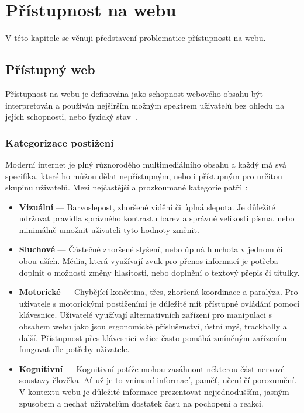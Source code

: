 \chapter{Přístupnost na webu}

V této kapitole se věnuji představení problematice přístupnosti na webu.

\section{Přístupný web}

Přístupnost na webu je definována jako schopnost webového obsahu být interpretován a používán nejširším možným spektrem uživatelů bez ohledu na jejich schopnosti, nebo fyzický stav~\cite{w3-accessibility}.

\subsection{Kategorizace postižení}

Moderní internet je plný různorodého multimediálního obsahu a každý má svá specifika, které ho můžou dělat nepřístupným, nebo i přístupným pro určitou skupinu uživatelů.
Mezi nejčastější a prozkoumané kategorie patří~\cite{w3-disabilities}:

\begin{itemize}
  \item \textbf{Vizuální} --- Barvoslepost, zhoršené vidění či úplná slepota.
        Je důležité udržovat pravidla správného kontrastu barev a správné velikosti písma, nebo minimálně umožnit uživateli tyto hodnoty změnit.
  \item \textbf{Sluchové} --- Částečně zhoršené slyšení, nebo úplná hluchota v jednom či obou uších.
        Média, která využívají zvuk pro přenos informací je potřeba doplnit o možnosti změny hlasitosti, nebo doplnění o textový přepis či titulky.
  \item \textbf{Motorické} --- Chybějící končetina, třes, zhoršená koordinace a paralýza.
        Pro uživatele s motorickými postiženími je důležité mít přístupné ovládání pomocí klávesnice.
        Uživatelé využívají alternativních zařízení pro manipulaci s obsahem webu jako jsou ergonomické příslušenství, ústní myš, trackbally a další.
        Přístupnost přes klávesnici velice často pomáhá zmíněným zařízením fungovat dle potřeby uživatele.
  \item \textbf{Kognitivní} --- Kognitivní potíže mohou zasáhnout některou část nervové soustavy člověka.
        Ať už je to vnímaní informací, paměť, učení čí porozumění.
        V kontextu webu je důležité informace prezentovat nejjednodušším, jasným způsobem a nechat uživatelům dostatek času na pochopení a reakci.
\end{itemize}

